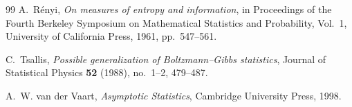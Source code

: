 \documentclass[11pt]{article}
\theoremstyle{definition}
\begin{document}
\begin{thebibliography}{99}
A.~R\'enyi,
\emph{On measures of entropy and information},
in Proceedings of the Fourth Berkeley Symposium on Mathematical Statistics
and Probability, Vol.~1, University of California Press, 1961,
pp.~547--561.

C.~Tsallis,
\emph{Possible generalization of Boltzmann--Gibbs statistics},
Journal of Statistical Physics \textbf{52} (1988), no.~1--2, 479--487.

A.~W. van der Vaart,
\emph{Asymptotic Statistics},
Cambridge University Press, 1998.

\end{thebibliography}
\end{document}
